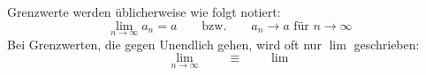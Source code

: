 Grenzwerte werden üblicherweise wie folgt notiert:
$$\lim_{n \to \infty} a_n = a \qquad \text{bzw.} \qquad a_n \rightarrow a \text{ für } n \to \infty$$
Bei Grenzwerten, die gegen Unendlich gehen, wird oft nur $\lim$ geschrieben:
$$\lim_{n \to \infty} \qquad \equiv \qquad \lim$$